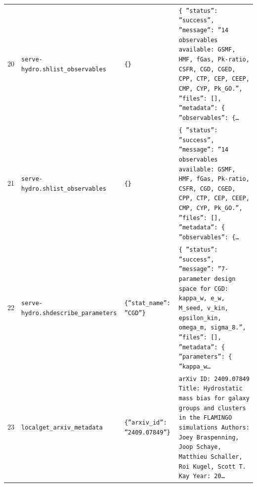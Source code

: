 \documentclass[11pt,a4paper]{article}
\begin{document}
\begin{longtable}{@{}p{}p{}p{}p{}@{}}
20 & \texttt{serve-hydro.sh}\newline\texttt{list\_\allowbreak{}observables} & \texttt{\{\}\allowbreak{}} & \texttt{\{   ''status'':\allowbreak{} ''success'',\allowbreak{}   ''message'':\allowbreak{} ''14 observables available:\allowbreak{} GSMF,\allowbreak{} HMF,\allowbreak{} fGas,\allowbreak{} Pk-ratio,\allowbreak{} CSFR,\allowbreak{} CGD,\allowbreak{} CGED,\allowbreak{} CPP,\allowbreak{} CTP,\allowbreak{} CEP,\allowbreak{} CEEP,\allowbreak{} CMP,\allowbreak{} CYP,\allowbreak{} Pk\_\allowbreak{}GO.'',\allowbreak{}   ''files'':\allowbreak{} []\allowbreak{},\allowbreak{}   ''metadata'':\allowbreak{} \{     ''observables'':\allowbreak{} \{\ldots{}\allowbreak{}} \\
21 & \texttt{serve-hydro.sh}\newline\texttt{list\_\allowbreak{}observables} & \texttt{\{\}\allowbreak{}} & \texttt{\{   ''status'':\allowbreak{} ''success'',\allowbreak{}   ''message'':\allowbreak{} ''14 observables available:\allowbreak{} GSMF,\allowbreak{} HMF,\allowbreak{} fGas,\allowbreak{} Pk-ratio,\allowbreak{} CSFR,\allowbreak{} CGD,\allowbreak{} CGED,\allowbreak{} CPP,\allowbreak{} CTP,\allowbreak{} CEP,\allowbreak{} CEEP,\allowbreak{} CMP,\allowbreak{} CYP,\allowbreak{} Pk\_\allowbreak{}GO.'',\allowbreak{}   ''files'':\allowbreak{} []\allowbreak{},\allowbreak{}   ''metadata'':\allowbreak{} \{     ''observables'':\allowbreak{} \{\ldots{}\allowbreak{}} \\
22 & \texttt{serve-hydro.sh}\newline\texttt{describe\_\allowbreak{}parameters} & \texttt{\{''stat\_\allowbreak{}name'':\allowbreak{} ''CGD''\}\allowbreak{}} & \texttt{\{   ''status'':\allowbreak{} ''success'',\allowbreak{}   ''message'':\allowbreak{} ''7-parameter design space for CGD:\allowbreak{} kappa\_\allowbreak{}w,\allowbreak{} e\_\allowbreak{}w,\allowbreak{} M\_\allowbreak{}seed,\allowbreak{} v\_\allowbreak{}kin,\allowbreak{} epsilon\_\allowbreak{}kin,\allowbreak{} omega\_\allowbreak{}m,\allowbreak{} sigma\_\allowbreak{}8.'',\allowbreak{}   ''files'':\allowbreak{} []\allowbreak{},\allowbreak{}   ''metadata'':\allowbreak{} \{     ''parameters'':\allowbreak{} \{       ''kappa\_\allowbreak{}w\ldots{}\allowbreak{}} \\
23 & \texttt{local}\newline\texttt{get\_\allowbreak{}arxiv\_\allowbreak{}metadata} & \texttt{\{''arxiv\_\allowbreak{}id'':\allowbreak{} ''2409.07849''\}\allowbreak{}} & \texttt{arXiv ID:\allowbreak{} 2409.07849 Title:\allowbreak{} Hydrostatic mass bias for galaxy groups and clusters in the FLAMINGO simulations Authors:\allowbreak{} Joey Braspenning,\allowbreak{} Joop Schaye,\allowbreak{} Matthieu Schaller,\allowbreak{} Roi Kugel,\allowbreak{} Scott T. Kay Year:\allowbreak{} 20\ldots{}\allowbreak{}} \\

\end{longtable}
\end{document}
